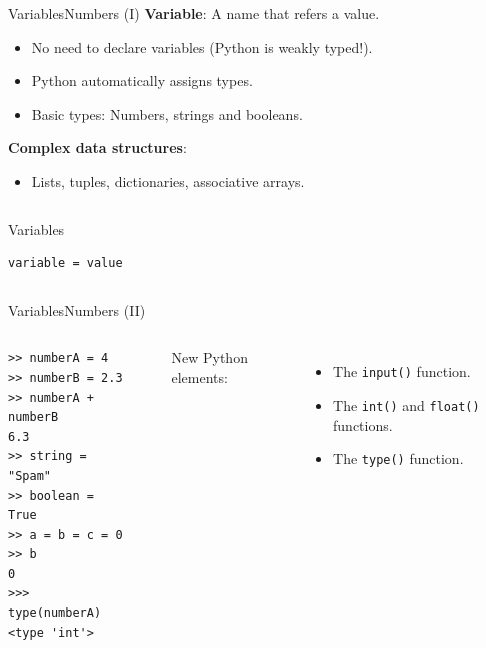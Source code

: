 \documentclass[10pt,compress]{beamer} %
\begin{document}
\begin{frame}[fragile]{Variables}{Numbers (I)}
 	\textbf{Variable}: A name that refers a value.
	\begin{itemize}
		\item No need to declare variables (Python is weakly typed!).
		\item Python automatically assigns types.
		\item Basic types: Numbers, strings and booleans.
	\end{itemize}
	\textbf{Complex data structures}:
		\begin{itemize}
		\item Lists, tuples, dictionaries, associative arrays.
		\end{itemize}

    \begin{columns}
	\begin{block}{Variables}
	\begin{verbatim}
variable = value
\end{verbatim}
	\end{block}
	\end{columns}
\end{frame}

\begin{frame}[fragile]{Variables}{Numbers (II)}
   	\begin{columns}
		\begin{exampleblock}{}
		\begin{verbatim}
>> numberA = 4
>> numberB = 2.3
>> numberA + numberB
6.3
>> string = "Spam"
>> boolean = True
>> a = b = c = 0
>> b
0
>>> type(numberA)
<type 'int'>
\end{verbatim}
		\end{exampleblock}


		\begin{exampleblock}{}
		
		\end{exampleblock}

	    \bigskip
        New Python elements:
        \begin{itemize}
            \item The \texttt{input()} function.
		    \item The \texttt{int()} and \texttt{float()} functions.
            \item The \texttt{type()} function.
        \end{itemize}
   \end{columns}
\end{frame}
\end{document}
